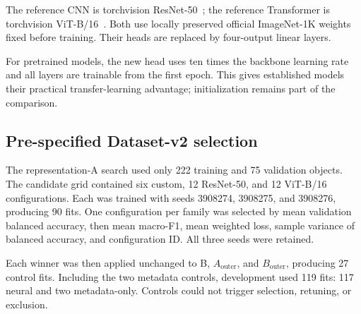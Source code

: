 \documentclass[preprint,12pt,authoryear]{elsarticle}
\newcommand{\balacc}{balanced accuracy}
\newcommand{\macrof}{macro-F1}
\begin{document}
The reference CNN is torchvision ResNet-50~\cite{he2016deep}; the reference
Transformer is torchvision ViT-B/16~\cite{dosovitskiy2020}. Both use locally
preserved official ImageNet-1K weights fixed before training.
Their heads are replaced by four-output linear layers.

\begin{table}[t]
\centering
\small
\caption{Training settings fixed before test evaluation. Every family uses batch
size 16, at most 100 epochs,
class-weighted cross-entropy, gradient-norm cap 3, ReduceLROnPlateau (factor 0.1,
patience 5), and early stopping with patience 20.}
\label{tab:models}
\end{table}

For pretrained models, the new head uses ten times the backbone learning rate and all
layers are trainable from the first epoch. This gives established models their
practical transfer-learning advantage; initialization remains part of the comparison.

\subsection{Pre-specified Dataset-v2 selection}

The representation-A search used only 222 training and 75 validation objects. The
candidate grid contained six custom, 12 ResNet-50, and 12 ViT-B/16 configurations. Each
was trained with seeds 3908274, 3908275, and 3908276, producing 90 fits. One
configuration per family was selected by mean validation \balacc{}, then mean
\macrof{}, mean weighted loss, sample variance of \balacc{}, and configuration ID.
All three seeds were retained.

Each winner was then applied unchanged to B, $A_{\mathrm{outer}}$, and
$B_{\mathrm{outer}}$, producing 27 control fits. Including the two metadata controls,
development used 119 fits: 117 neural and two metadata-only. Controls could not
trigger selection, retuning, or exclusion.
\end{document}

